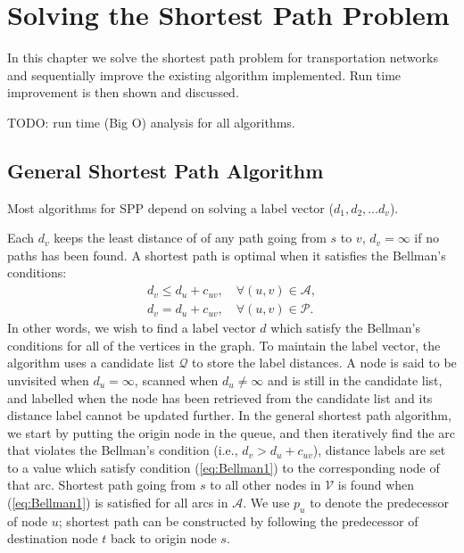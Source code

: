 \chapter{Solving the Shortest Path Problem}
\label{chapter:solvingspp}

In this chapter we solve the shortest path problem
for transportation networks and sequentially
improve the existing algorithm implemented.
Run time improvement is then shown and discussed.

{
    TODO: run time (Big O) analysis for all algorithms.
}
\section{General Shortest Path Algorithm}
Most algorithms for SPP depend on solving a label vector ($d_1, d_2,\dots d_v$).

Each $d_v$ keeps the least distance of of any path going from $s$ to $v$, $d_v = \infty$ if no paths has been found.
A shortest path is optimal when it satisfies the Bellman's conditions:
\begin{align}
    d_v \leq d_u + c_{uv}, \quad \forall(u,v) \in \mathcal{A}, \label{eq:Bellman1}\\
    d_v  =   d_u + c_{uv}, \quad \forall(u,v) \in \mathcal{P}.
\end{align}
In other words,
we wish to find a label vector $d$ which satisfy the Bellman's conditions for all of the vertices in the graph.
To maintain the label vector, the algorithm uses a candidate list $\mathcal{Q}$ to store the label distances.
A node is said to be unvisited when $d_u = \infty$,
scanned when $d_u \neq \infty$ and is still in the candidate list,
and labelled when the node has been retrieved from the candidate list and its distance label cannot be updated further.
In the general shortest path algorithm,
we start by putting the origin node in the queue,
and then iteratively find the arc that violates the Bellman's condition (i.e., $d_v > d_u + c_{uv}$),
distance labels are set to a value which satisfy condition (\ref{eq:Bellman1}) to the corresponding node of that arc.
Shortest path going from $s$ to all other nodes in $\mathcal{V}$ is found when (\ref{eq:Bellman1}) is satisfied for all arcs in $\mathcal{A}$.
We use $p_u$ to denote the predecessor of node $u$;
shortest path can be constructed by following the predecessor of destination node $t$ back to origin node $s$.

